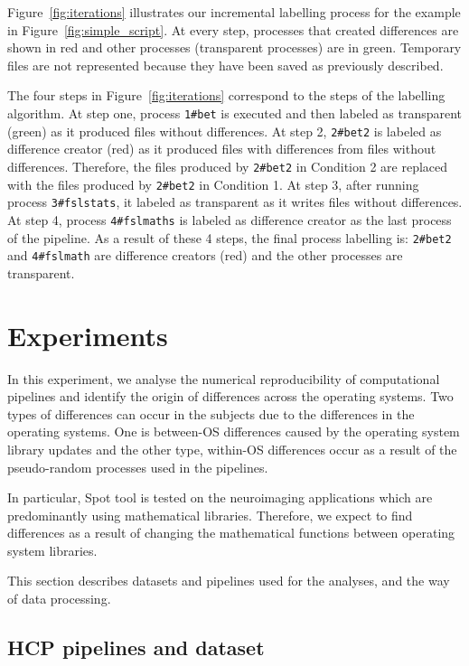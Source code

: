 \documentclass[a4paper,num-refs]{oup-contemporary}
\begin{document}
Figure~\ref{fig:iterations} illustrates our incremental labelling 
process for the example in Figure~\ref{fig:simple_script}. At every 
step, processes that created differences are shown in red and other processes 
(transparent processes) are in green. Temporary files are not represented 
because they have been saved as previously described.

The four steps in Figure~\ref{fig:iterations} correspond to the 
steps of the labelling algorithm. 
At step one, process \texttt{1\#bet} is executed and then labeled 
as transparent (green) as it produced files without differences.
At step 2, \texttt{2\#bet2} 
is labeled as difference creator (red) as it produced files with differences 
from files without differences. Therefore, the files produced by \texttt{2\#bet2} in  
Condition 2 are replaced with the files produced by \texttt{2\#bet2} in 
Condition 1.
At step 3, after running process \texttt{3\#fslstats}, it labeled as 
transparent as it writes files without differences.
At step 4, process \texttt{4\#fslmaths} is labeled as difference creator 
as the last process of the pipeline.
As a result of these 4 steps, the final process labelling is: 
\texttt{2\#bet2} and \texttt{4\#fslmath} are difference creators (red) 
and the other processes are transparent.


\section{Experiments}

In this experiment, we analyse the numerical reproducibility of computational pipelines 
and identify the origin of differences across the operating systems. 
Two types of differences can occur in the subjects due to the differences
in the operating systems. One is between-OS differences caused by the
operating system library updates and the other type, within-OS differences
occur as a result of the pseudo-random processes used in the pipelines.

In particular, Spot tool is tested on the neuroimaging applications which are 
predominantly using mathematical libraries. Therefore, we expect to find 
differences as a result of changing the mathematical functions between operating system libraries.

This section describes datasets and pipelines used for the analyses, and the way of data processing.

\subsection{HCP pipelines and dataset}
\end{document}
